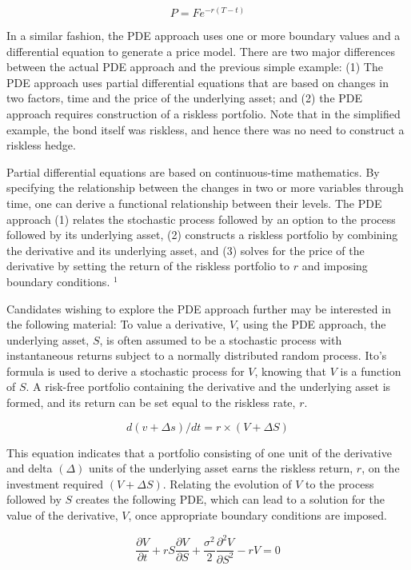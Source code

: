 \documentclass[11pt]{article}
\begin{document}
$$
P=F e^{-r(T-t)}
$$

In a similar fashion, the PDE approach uses one or more boundary values and a differential equation to generate a price model. There are two major differences between the actual PDE approach and the previous simple example: (1) The PDE approach uses partial differential equations that are based on changes in two factors, time and the price of the underlying asset; and (2) the PDE approach requires construction of a riskless portfolio. Note that in the simplified example, the bond itself was riskless, and hence there was no need to construct a riskless hedge.

Partial differential equations are based on continuous-time mathematics. By specifying the relationship between the changes in two or more variables through time, one can derive a functional relationship between their levels. The PDE approach (1) relates the stochastic process followed by an option to the process followed by its underlying asset, (2) constructs a riskless portfolio by combining the derivative and its underlying asset, and (3) solves for the price of the derivative by setting the return of the riskless portfolio to $r$ and imposing boundary conditions. ${ }^{1}$

Candidates wishing to explore the PDE approach further may be interested in the following material: To value a derivative, $V$, using the PDE approach, the underlying asset, $S$, is often assumed to be a stochastic process with instantaneous returns subject to a normally distributed random process. Ito's formula is used to derive a stochastic process for $V$, knowing that $V$ is a function of $S$. A risk-free portfolio containing the derivative and the underlying asset is formed, and its return can be set equal to the riskless rate, $r$.


\begin{equation*}
d(v+\Delta s) / d t=r \times(V+\Delta S) \tag{1}
\end{equation*}


This equation indicates that a portfolio consisting of one unit of the derivative and delta $(\Delta)$ units of the underlying asset earns the riskless return, $r$, on the investment required $(V+\Delta S)$. Relating the evolution of $V$ to the process followed by $S$ creates the following PDE, which can lead to a solution for the value of the derivative, $V$, once appropriate boundary conditions are imposed.


\begin{equation*}
\frac{\partial V}{\partial t}+r S \frac{\partial V}{\partial S}+\frac{\sigma^{2}}{2} \frac{\partial^{2} V}{\partial S^{2}}-r V=0 \tag{2}
\end{equation*}
\end{document}
